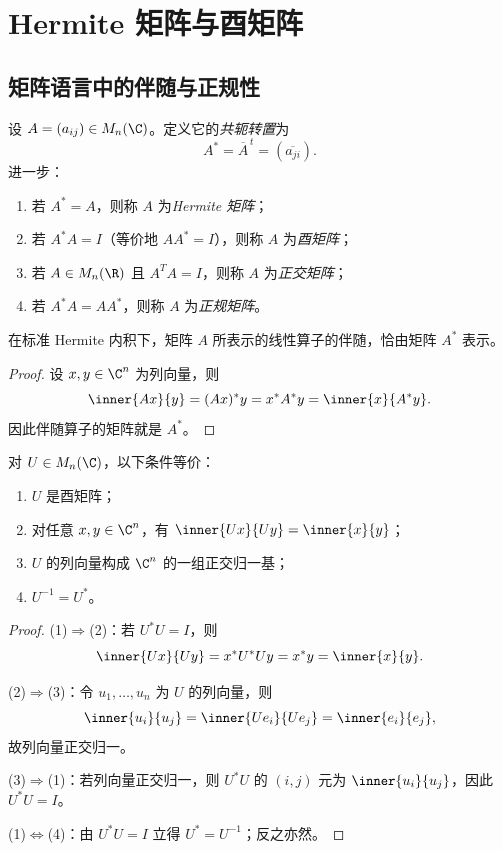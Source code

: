\section{Hermite 矩阵与酉矩阵}

\subsection{矩阵语言中的伴随与正规性}

\begin{definition}
设 $A=(a_{ij})\in M_n(\C)$。定义它的\emph{共轭转置}为
\[
A^*=\overline{A}^{\,t}=(\overline{a_{ji}}).
\]
进一步：
\begin{enumerate}[label=\textnormal{(\arabic*)}]
  \item 若 $A^*=A$，则称 $A$ 为\emph{Hermite 矩阵}；
  \item 若 $A^*A=I$（等价地 $AA^*=I$），则称 $A$ 为\emph{酉矩阵}；
  \item 若 $A\in M_n(\R)$ 且 $A^TA=I$，则称 $A$ 为\emph{正交矩阵}；
  \item 若 $A^*A=AA^*$，则称 $A$ 为\emph{正规矩阵}。
\end{enumerate}
\end{definition}

\begin{proposition}
在标准 Hermite 内积下，矩阵 $A$ 所表示的线性算子的伴随，恰由矩阵 $A^*$ 表示。
\end{proposition}

\begin{proof}
设 $x,y\in\C^n$ 为列向量，则
\[
\inner{Ax}{y}=(Ax)^*y=x^*A^*y=\inner{x}{A^*y}.
\]
因此伴随算子的矩阵就是 $A^*$。
\end{proof}

\begin{proposition}
对 $U\in M_n(\C)$，以下条件等价：
\begin{enumerate}[label=\textnormal{(\arabic*)}]
  \item $U$ 是酉矩阵；
  \item 对任意 $x,y\in\C^n$，有 $\inner{Ux}{Uy}=\inner{x}{y}$；
  \item $U$ 的列向量构成 $\C^n$ 的一组正交归一基；
  \item $U^{-1}=U^*$。
\end{enumerate}
\end{proposition}

\begin{proof}
(1)$\Rightarrow$(2)：若 $U^*U=I$，则
\[
\inner{Ux}{Uy}=x^*U^*Uy=x^*y=\inner{x}{y}.
\]

(2)$\Rightarrow$(3)：令 $u_1,\dots,u_n$ 为 $U$ 的列向量，则
\[
\inner{u_i}{u_j}=\inner{Ue_i}{Ue_j}=\inner{e_i}{e_j},
\]
故列向量正交归一。

(3)$\Rightarrow$(1)：若列向量正交归一，则 $U^*U$ 的 $(i,j)$ 元为 $\inner{u_i}{u_j}$，因此 $U^*U=I$。

(1)$\Leftrightarrow$(4)：由 $U^*U=I$ 立得 $U^*=U^{-1}$；反之亦然。
\end{proof}

